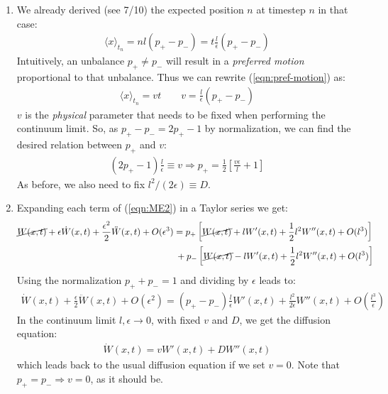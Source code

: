 \documentclass[../template.tex]{subfiles}
\begin{document}
\begin{exo}
    \begin{enumerate}
        \item We already derived (see 7/10) the expected position $n$ at timestep $n$ in that case:
        \begin{align}
            \langle x \rangle_{t_n} = n l (p_+ - p_-) = t\frac{l}{\epsilon} (p_+ - p_-) \label{eqn:pref-motion}
        \end{align}
        Intuitively, an unbalance $p_+ \neq p_-$ will result in a \textit{preferred motion} proportional to that unbalance. Thus we can rewrite (\ref{eqn:pref-motion}) as: 
        \begin{align*}
            \langle x \rangle_{t_n} = vt \qquad v = \frac{l}{\epsilon}(p_+ - p_-) 
        \end{align*}
        $v$ is the \textit{physical} parameter that needs to be fixed when performing the continuum limit. So, as $p_+ - p_- = 2p_+ -1$ by normalization, we can find the desired relation between $p_+$ and $v$:
        \begin{align*}
            (2p_+ - 1) \frac{l}{\epsilon} \equiv v \Rightarrow p_+ = \frac{1}{2} \left[\frac{v \epsilon}{l} + 1 \right]  
        \end{align*}
        As before, we also need to fix $l^2/(2\epsilon) \equiv D$.
        \item Expanding each term of (\ref{eqn:ME2}) in a Taylor series we get:
        \begin{align*}
            \cancel{W(x,t)} + \epsilon \dot{W}(x,t) + \frac{\epsilon^2}{2} \ddot{W}(x,t) + O(\epsilon^3) &= p_+ \left[\cancel{W(x,t)} + l W'(x,t) + \frac{1}{2} l^2 W''(x,t) + O(l^3) \right]\\
            &\> + p_- \left[\cancel{W(x,t)} - lW'(x,t) + \frac{1}{2} l^2 W''(x,t) + O(l^3)  \right]      
        \end{align*}
        Using the normalization $p_+ + p_- = 1$ and dividing by $\epsilon$ leads to:
        \begin{align*}
            \dot{W}(x,t) + \frac{\epsilon}{2} \ddot{W}(x,t) + O(\epsilon^2) = (p_+-p_-) \frac{l}{\epsilon} W'(x,t) + \frac{l^2}{2 \epsilon} W''(x,t) + O\left(\frac{l^3}{\epsilon} \right)   
        \end{align*}
        In the continuum limit $l, \epsilon \to 0$, with fixed $v$ and $D$, we get the diffusion equation:
        \begin{align*}
            \dot{W}(x,t) = v W'(x,t) + D W''(x,t)
        \end{align*}
        which leads back to the usual diffusion equation if we set $v = 0$. Note that $p_+ = p_- \Rightarrow v = 0$, as it should be. 
    \end{enumerate}
\end{exo}
\end{document}
